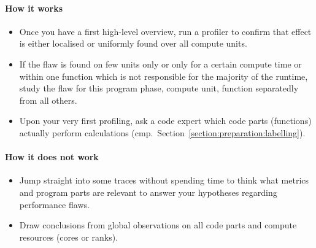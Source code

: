 \paragraph*{How it works}

\begin{itemize}[noitemsep]
  \item[$\boxplus$] Once you have a first high-level overview, run a profiler to
  confirm that effect is either localised or uniformly found over all compute
  units.
  \item[$\boxplus$] If the flaw is found on few units only or only for a certain
  compute time or within one function which is not responsible for the majority
  of the runtime, study the flaw for this program phase, compute unit, function
  separatedly from all others.
  \item[$\boxplus$] Upon your very first profiling, ask a code expert which code parts (functions) actually perform calculations (cmp.~Section~\ref{section:preparation:labelling}).
\end{itemize}


\paragraph*{How it does not work}

\begin{itemize}[noitemsep]
  \item[$\boxminus$] Jump straight into some traces without spending time to
  think what metrics and program parts are relevant to answer your
  hypotheses regarding  performance flaws.
  \item[$\boxminus$] Draw conclusions from global observations on all code parts
  and compute resources (cores or ranks).
\end{itemize}
